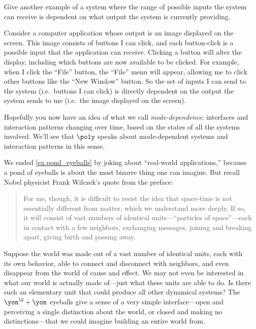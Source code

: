 \begin{exercise}
    Give another example of a system where the range of possible inputs the system can receive is dependent on what output the system is currently providing.
    \begin{solution}
        Consider a computer application whose output is an image displayed on the screen.
        This image consists of buttons I can click, and each button-click is a possible input that the application can receive.
        Clicking a button will alter the display, including which buttons are now available to be clicked.
        For example, when I click the ``File'' button, the ``File'' menu will appear, allowing me to click other buttons like the ``New Window'' button.
        So the set of inputs I can send to the system (i.e.\ buttons I can click) is directly dependent on the output the system sends to me (i.e.\ the image displayed on the screen).
    \end{solution}
\end{exercise}

Hopefully you now have an idea of what we call \emph{mode-dependence}: interfaces and interaction patterns changing over time, based on the states of all the systems involved. We'll see that $\poly$ speaks about mode-dependent systems and interaction patterns in this sense.

\begin{remark}
    We ended \cref{ex.pond_eyeballs} by joking about ``real-world applications,'' because a pond of eyeballs is about the most bizarre thing one can imagine. But recall Nobel physicist Frank Wilczek's quote from the preface:
    \begin{quote}
        For me, though, it is difficult to resist the idea that space-time is not essentially different from matter, which we understand more deeply. If so, it will consist of vast numbers of identical units---``particles of space''---each in contact with a few neighbors, exchanging messages, joining and breaking apart, giving birth and passing away.
    \end{quote}
    Suppose the world was made out of a vast number of identical units, each with its own behavior, able to connect and disconnect with neighbors, and even disappear from the world of cause and effect. We may not even be interested in what our world is actually made of---just what these units are able to do. Is there such an elementary unit that could produce all other dynamical systems? The $\yon^\2+\yon$ eyeballs give a sense of a very simple interface---open and perceiving a single distinction about the world, or closed and making no distinctions---that we could imagine building an entire world from.
\end{remark}

